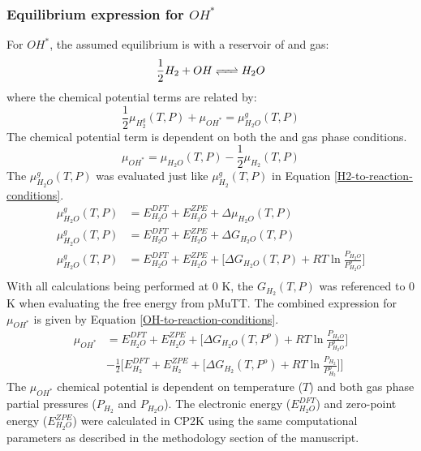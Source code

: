 \documentclass[12pt]{article}
\begin{document}
\subsubsection{Equilibrium expression for $OH^{*}$}
For $OH^{*}$, the assumed equilibrium is with a reservoir of  and  gas:
\begin{equation}
    \frac{1}{2} H_{2} + OH \ce{<=>} H_{2}O
\end{equation}
where the chemical potential terms are related by: 
\begin{equation}
    \frac{1}{2} \mu_{H_{2}^{g}}(T,P) + \mu_{OH^{*}} = \mu_{H_{2}O}^{g}(T,P) 
\end{equation}
The  chemical potential term is dependent on both the  and  gas phase conditions. 
\begin{equation}
    \mu_{OH^{*}} = \mu_{H_{2}O}(T,P) - \frac{1}{2} \mu_{H_{2}}(T,P)    
\end{equation}
The $\mu_{H_{2}O}^{g}(T,P)$ was evaluated just like $\mu_{H_{2}}^{g}(T,P)$ in Equation \ref{H2-to-reaction-conditions}. 
\begin{equation}
    \begin{split}
         \mu_{H_{2}O}^{g}(T,P) &= E_{H_{2}O}^{DFT} + E_{H_{2}O}^{ZPE} + \Delta \mu_{H_{2}O}(T,P)  \\
         \mu_{H_{2}O}^{g}(T,P) &= E_{H_{2}O}^{DFT} + E_{H_{2}O}^{ZPE} + \Delta G_{H_{2}O}(T,P) \\ 
         \mu_{H_{2}O}^{g}(T,P) &= E_{H_{2}O}^{DFT} + E_{H_{2}O}^{ZPE} + \Big[ \Delta G_{H_{2}O}(T,P)  + RT \ln{ \frac{P_{H_{2}O}}{P_{H_{2}O}^{o}}} \Big]  \\ 
    \end{split}
    \label{H2O-to-reaction-conditions}
\end{equation}
With all calculations being performed at 0 K, the $G_{H_{2}}(T,P)$ was referenced to 0 K when evaluating the free energy from pMuTT. The combined expression for $\mu_{OH^{*}}$ is given by Equation \ref{OH-to-reaction-conditions}.
\begin{equation}
    \begin{split}
    \mu_{OH^{*}} &=  E_{H_{2}O}^{DFT} + E_{H_{2}O}^{ZPE} + \Big[ \Delta G_{H_{2}O}(T,P^{o})  + RT \ln{ \frac{P_{H_{2}O}}{P_{H_{2}O}^{o}}} \Big] \\
    &- \frac{1}{2} \Big[ E_{H_{2}}^{DFT} + E_{H_{2}}^{ZPE} + \big[ \Delta G_{H_{2}}(T,P^{o})  + RT \ln{ \frac{P_{H_2}}{P_{H_2}^{o}}} \big] \Big] 
    \end{split}
    \label{OH-to-reaction-conditions}
\end{equation} 
The $\mu_{OH^{*}}$ chemical potential is dependent on temperature ($T$) and both gas phase partial pressures ($P_{H_2}$ and $P_{H_{2}O}$). The electronic energy ($E_{H_{2}O}^{DFT}$) and zero-point energy ($E_{H_{2}O}^{ZPE}$) were calculated in CP2K using the same computational parameters as described in the methodology section of the manuscript. \\
\end{document}
